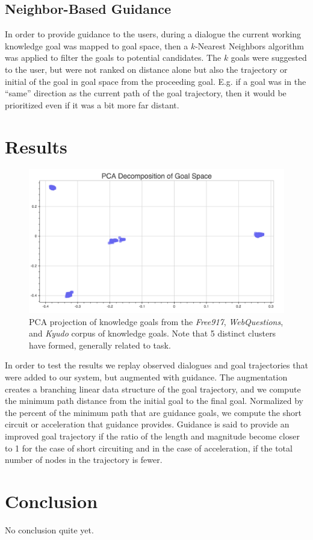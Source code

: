 \documentclass[letterpaper]{article}
\begin{document}
\subsection{Neighbor-Based Guidance}

In order to provide guidance to the users, during a dialogue the current working knowledge goal was mapped to goal space, then a $k$-Nearest Neighbors algorithm was applied to filter the goals to potential candidates. The $k$ goals were suggested to the user, but were not ranked on distance alone but also the trajectory or initial of the goal in goal space from the proceeding goal. E.g. if a goal was in the ``same'' direction as the current path of the goal trajectory, then it would be prioritized even if it was a bit more far distant.

\section{Results}

\begin{figure}[!t]
	\centering
    \includegraphics[width=\columnwidth]{figures/goalspace.png}
    \caption{PCA projection of knowledge goals from the \textit{Free917}, \textit{WebQuestions}, and \textit{Kyudo} corpus of knowledge goals. Note that 5 distinct clusters have formed, generally related to task.}
    \label{fig:goalspace}
\end{figure}

In order to test the results we replay observed dialogues and goal trajectories that were added to our system, but augmented with guidance. The augmentation creates a branching linear data structure of the goal trajectory, and we compute the minimum path distance from the initial goal to the final goal. Normalized by the percent of the minimum path that are guidance goals, we compute the short circuit or acceleration that guidance provides. Guidance is said to provide an improved goal trajectory if the ratio of the length and magnitude become closer to 1 for the case of short circuiting and in the case of acceleration, if the total number of nodes in the trajectory is fewer. 

\section{Conclusion}

No conclusion quite yet.



\end{document}
